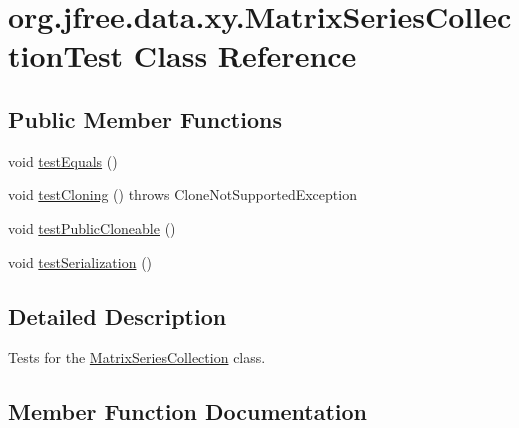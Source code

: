 \hypertarget{classorg_1_1jfree_1_1data_1_1xy_1_1_matrix_series_collection_test}{}\section{org.\+jfree.\+data.\+xy.\+Matrix\+Series\+Collection\+Test Class Reference}
\label{classorg_1_1jfree_1_1data_1_1xy_1_1_matrix_series_collection_test}
\subsection*{Public Member Functions}
\begin{DoxyCompactItemize}
\item 
void \mbox{\hyperlink{classorg_1_1jfree_1_1data_1_1xy_1_1_matrix_series_collection_test_af8caf1814504b158de8702ded59e0c35}{test\+Equals}} ()
\item 
void \mbox{\hyperlink{classorg_1_1jfree_1_1data_1_1xy_1_1_matrix_series_collection_test_a7faf85f16fc8ade44cd80af0d73462bb}{test\+Cloning}} ()  throws Clone\+Not\+Supported\+Exception 
\item 
void \mbox{\hyperlink{classorg_1_1jfree_1_1data_1_1xy_1_1_matrix_series_collection_test_a37cf450d506e80d8fae7dde6f0c22e96}{test\+Public\+Cloneable}} ()
\item 
void \mbox{\hyperlink{classorg_1_1jfree_1_1data_1_1xy_1_1_matrix_series_collection_test_a814e6e847977f6091048ce61a0a92b73}{test\+Serialization}} ()
\end{DoxyCompactItemize}


\subsection{Detailed Description}
Tests for the \mbox{\hyperlink{classorg_1_1jfree_1_1data_1_1xy_1_1_matrix_series_collection}{Matrix\+Series\+Collection}} class. 

\subsection{Member Function Documentation}
\mbox{\label{classorg_1_1jfree_1_1data_1_1xy_1_1_matrix_series_collection_test_a7faf85f16fc8ade44cd80af0d73462bb}} 
